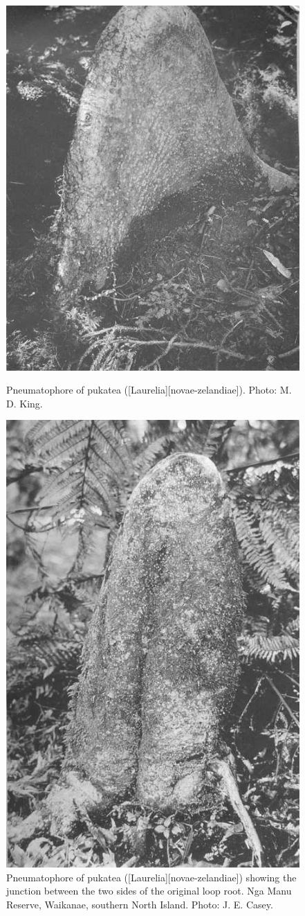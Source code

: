 \begin{figure}[htb]
	\centering
	\begin{minipage}[t]{0.475\textwidth}
		\centering
		\includegraphics[height=0.8\textwidth]{graphics/figure10pukatea.jpg}
    	\caption[Pneumatophore of pukatea]{Pneumatophore of pukatea ([Laurelia][novae-zelandiae]).
    	Photo:  M. D. King.}%
    	\label{fig:10pukatea}
	\end{minipage}\hfill%
	\begin{minipage}[t]{0.475\textwidth}
    	\centering
    	\includegraphics[height=.8\textwidth]{graphics/figure11pukatea.jpg}
    	\caption[Pneumatophore of pukatea showing the junction between the two sides of the original loop root]{Pneumatophore of pukatea ([Laurelia][novae-zelandiae]) showing the junction between the two sides of the original loop root.
    	Nga Manu Reserve, Waikanae, southern North Island.
    	Photo:  J. E. Casey.}%
    	\label{fig:11pukatea}
	\end{minipage}
\end{figure}

